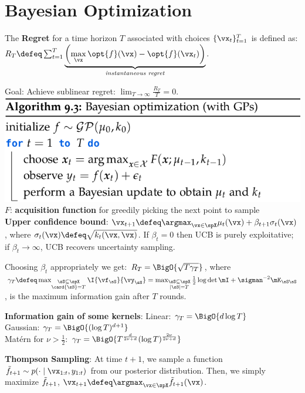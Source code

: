 \section{Bayesian Optimization}
\begin{framed}
    The \textbf{Regret} for a time horizon $T$ associated with choices $\{\vx_t\}_{t=1}^T$ is defined as: $R_T \defeq \sum_{t=1}^T \underbrace{\left({\max_\vx \opt{f}(\vx) - \opt{f}(\vx_t)}\right)}_{\text{\textit{instantaneous regret}}}$.
\end{framed}
Goal: Achieve sublinear regret: $\lim_{T\to\infty} \frac{R_T}{T} = 0$.
\includegraphics[width=0.98\linewidth]{images/Bayesian_Optimization.png}
$F$: \textbf{acquisition function} for greedily picking the next point to sample \\
\textbf{Upper confidence bound}: $\vx_{t+1} \defeq \argmax_{\vx \in \spX} \mu_{t}(\vx) + \beta_{t+1} \sigma_{t}(\vx)$, where $\sigma_t(\vx) \defeq \sqrt{k_t(\vx, \vx)}$. If $\beta_t = 0$ then UCB is purely exploitative; if $\beta_t \to \infty$, UCB recovers uncertainty sampling.
\begin{framed}
    Choosing $\beta_t$ appropriately we get: $R_T = \BigO{\sqrt{T \gamma_T}}$, where $\gamma_T \defeq \max_{\substack{\sS \subseteq \spX \\ \card{\sS} = T}} \I{\vf_\sS}{\vy_\sS} = \max_{\substack{\sS \subseteq \spX \\ |\sS| = T}} \frac{1}{2} \log\det{\mI + \sigman^{-2} \mK_{\sS\sS}}$, is the maximum information gain after $T$ rounds.
\end{framed}
\begin{framed}
    \textbf{Information gain of some kernels}:
    Linear: $\gamma_T = \BigO{d \log T}$ \\
    Gaussian: $\gamma_T = \BigO{(\log T)^{d+1}}$ \\
    Matérn for $\nu > \frac{1}{2}$: $\gamma_T = \BigO{T^{\frac{d}{2\nu + d}} (\log T)^{\frac{2\nu}{2\nu + d}}}$
\end{framed}
\textbf{Thompson Sampling}: At time $t+1$, we sample a function $\Tilde{f}_{t+1} \sim p(\cdot \mid \vx_{1:t}, y_{1:t})$ from our posterior distribution.
Then, we simply maximize $\Tilde{f}_{t+1}$, $\vx_{t+1} \defeq \argmax_{\vx \in \spX} \Tilde{f}_{t+1}(\vx)$.
